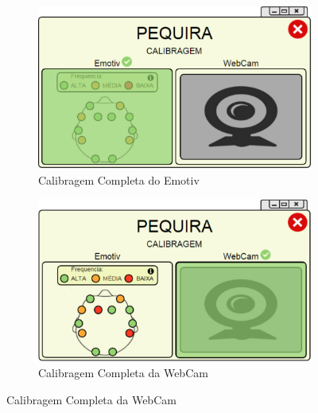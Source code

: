 \documentclass[12pt]{article}
\begin{document}
\begin{figure}[h]
\begin{subfigure}{0.5\textwidth}
\centering
\includegraphics[scale=0.4]{imagens2/1-2CalibragemcompletaEmotiv.pdf}
\caption{Calibragem Completa do Emotiv}
\label{calibragem_emotiv}
\end{subfigure}
\begin{subfigure}{0.5\textwidth}
\includegraphics[scale=0.4]{imagens2/1-3CalibragemcompletaWebCam.pdf} 
\caption{Calibragem Completa da WebCam}
\label{calibragem_webcam}
\end{subfigure}
\end{figure}
\end{document}
